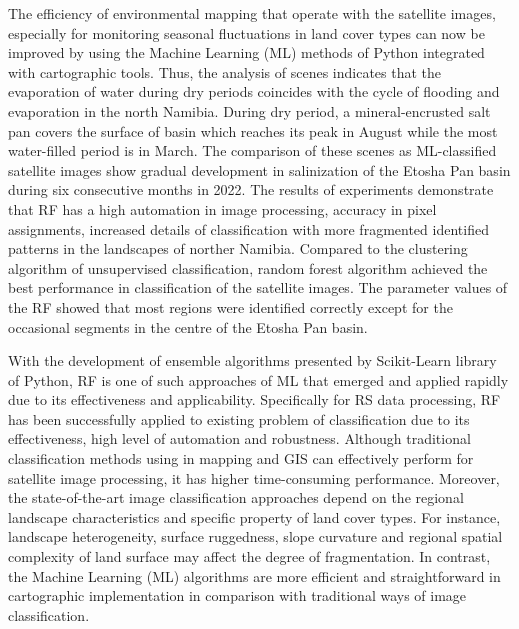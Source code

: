 \documentclass[draft]{agujournal2019}
\begin{document}
The efficiency of environmental mapping that operate with the satellite images, especially for monitoring seasonal fluctuations in land cover types can now be improved by using the Machine Learning (ML) methods of Python integrated with cartographic tools. Thus, the analysis of scenes indicates that the evaporation of water during dry periods coincides with the cycle of flooding and evaporation in the north Namibia. During dry period, a mineral-encrusted salt pan covers the surface of basin which reaches its peak in August while the most water-filled period is in March. The comparison of these scenes as ML-classified satellite images show gradual development in salinization of the Etosha Pan basin during six consecutive months in 2022. The results of experiments demonstrate that RF has a high automation in image processing, accuracy in pixel assignments, increased details of classification with more fragmented identified patterns in the landscapes of norther Namibia. Compared to the clustering algorithm of unsupervised classification, random forest algorithm achieved the best performance in classification of the satellite images. The parameter values of the RF showed that most regions were identified correctly except for the occasional segments in the centre of the Etosha Pan basin.

With the development of ensemble algorithms presented by Scikit-Learn library of Python, RF is one of such approaches of ML that emerged and applied rapidly due to its effectiveness and applicability. Specifically for RS data processing, RF has been successfully applied to existing problem of classification due to its effectiveness, high level of automation and robustness. Although traditional classification methods using in mapping and GIS can effectively perform for satellite image processing, it has higher time-consuming performance. Moreover, the state-of-the-art image classification approaches depend on the regional landscape characteristics and specific property of land cover types. For instance, landscape heterogeneity, surface ruggedness, slope curvature and regional spatial complexity of land surface may affect the degree of fragmentation. In contrast, the Machine Learning (ML) algorithms are more efficient and straightforward in cartographic implementation in comparison with traditional ways of image classification. 
\end{document}
